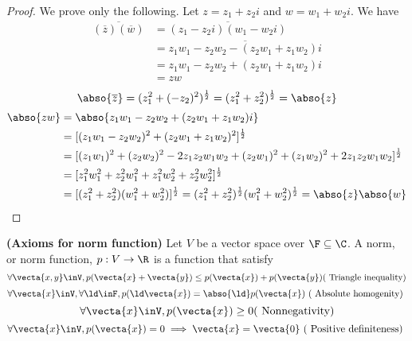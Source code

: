 \documentclass{report}
\begin{document}
\begin{proof}
We prove only the following. Let $z=z_1+z_2i$ and $w=w_1+w_2i$. We have
 \begin{align*}
   \overline{(\overline{z})(\overline{w})}&=\overline{(z_1-z_2i)(w_1-w_2i)}\\
   &=\overline{z_1w_1-z_2w_2-(z_2w_1+z_1w_2)i}\\
   &=z_1w_1-z_2w_2+(z_2w_1+z_1w_2)i\\
   &=zw
\end{align*}
\begin{equation*}
\abso{\overline{z}}=(z_1^2+(-z_2)^2)^{\frac{1}{2}}=(z_1^2+z_2^2)^{\frac{1}{2}}=\abso{z}
\end{equation*}
\begin{align*}
\abso{zw}&=\abso{z_1w_1-z_2w_2+(z_2w_1+z_1w_2)i}\\
&=[(z_1w_1-z_2w_2)^2+(z_2w_1+z_1w_2)^2]^{\frac{1}{2}}\\
&=[(z_1w_1)^2+(z_2w_2)^2-2z_1z_2w_1w_2+(z_2w_1)^2+(z_1w_2)^2+2z_1z_2w_1w_2]^{\frac{1}{2}}\\
&=[z_1^2w_1^2+z_2^2w_1^2+z_1^2w_2^2+z_2^2w_2^2]^{\frac{1}{2}}\\
&=[(z_1^2+z_2^2)(w_1^2+w_2^2)]^{\frac{1}{2}}=(z_1^2+z_2^2)^{\frac{1}{2}}(w_1^2+w_2^2)^{\frac{1}{2}}=\abso{z}\abso{w}
\end{align*}
\end{proof}
\begin{axiom}
\label{1.6.4}
\textbf{(Axioms for norm function)} Let $V$ be a vector space over  $\F\subseteq\C$. A norm, or norm function, $p:V\rightarrow \R$ is a function that satisfy 
\begin{equation*}
  \forall \vecta{x,y}\inV, p(\vecta{x}+\vecta{y})\leq p(\vecta{x})+p(\vecta{y})  \text{( Triangle inequality)}
\end{equation*}
\begin{equation*}
\forall \vecta{x}\inV,\forall \ld\inF, p(\ld\vecta{x})=\abso{\ld}p(\vecta{x})\text{ ( Absolute homogenity) }
\end{equation*}
\begin{equation*}
\forall \vecta{x}\inV,p(\vecta{x})\geq 0\text{( Nonnegativity)}
\end{equation*}
\begin{equation*}
\forall \vecta{x}\inV, p(\vecta{x})=0\implies \vecta{x}=\vecta{0} \text{ ( Positive definiteness) }
\end{equation*}

\end{axiom}
\end{document}
